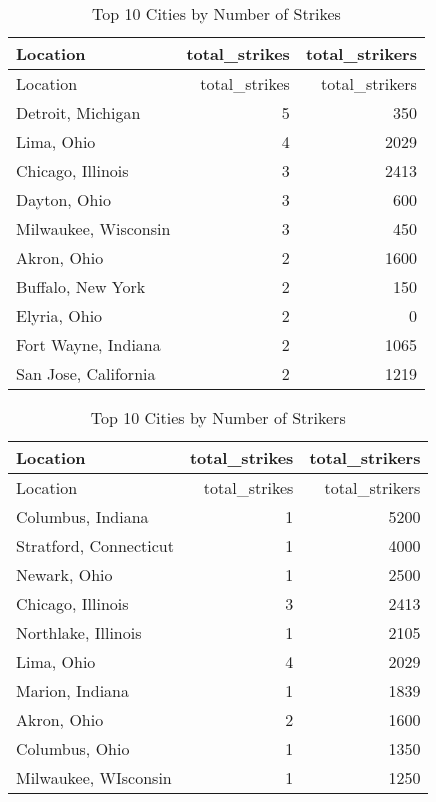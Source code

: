 \documentclass[
]{article}
\begin{document}
\begin{longtable}[]{@{}lrr@{}}
\caption{Top 10 Cities by Number of Strikes}\tabularnewline
\toprule\noalign{}
Location & total\_strikes & total\_strikers \\
\midrule\noalign{}
\endfirsthead
\toprule\noalign{}
Location & total\_strikes & total\_strikers \\
\midrule\noalign{}
\endhead
\bottomrule\noalign{}
\endlastfoot
Detroit, Michigan & 5 & 350 \\
Lima, Ohio & 4 & 2029 \\
Chicago, Illinois & 3 & 2413 \\
Dayton, Ohio & 3 & 600 \\
Milwaukee, Wisconsin & 3 & 450 \\
Akron, Ohio & 2 & 1600 \\
Buffalo, New York & 2 & 150 \\
Elyria, Ohio & 2 & 0 \\
Fort Wayne, Indiana & 2 & 1065 \\
San Jose, California & 2 & 1219 \\
\end{longtable}

\begin{longtable}[]{@{}lrr@{}}
\caption{Top 10 Cities by Number of Strikers}\tabularnewline
\toprule\noalign{}
Location & total\_strikes & total\_strikers \\
\midrule\noalign{}
\endfirsthead
\toprule\noalign{}
Location & total\_strikes & total\_strikers \\
\midrule\noalign{}
\endhead
\bottomrule\noalign{}
\endlastfoot
Columbus, Indiana & 1 & 5200 \\
Stratford, Connecticut & 1 & 4000 \\
Newark, Ohio & 1 & 2500 \\
Chicago, Illinois & 3 & 2413 \\
Northlake, Illinois & 1 & 2105 \\
Lima, Ohio & 4 & 2029 \\
Marion, Indiana & 1 & 1839 \\
Akron, Ohio & 2 & 1600 \\
Columbus, Ohio & 1 & 1350 \\
Milwaukee, WIsconsin & 1 & 1250 \\
\end{longtable}
\end{document}
